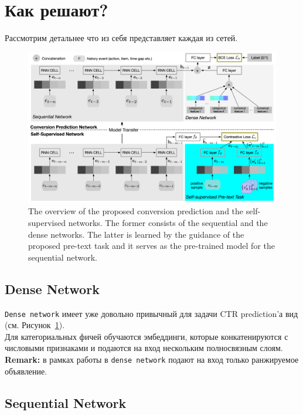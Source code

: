 \section{Как решают?}

Рассмотрим детальнее что из себя представляет каждая из сетей. 

\begin{figure}[ht]
    \centering
    \includegraphics[width=1.0\linewidth]{images/pretraining.png}
    \caption{\small{The overview of the proposed conversion prediction and the self-supervised networks. The former consists of the sequential and the dense networks. The latter is learned by the guidance of the proposed pre-text task and it serves as the pre-trained model for the sequential network.}}
    \label{fig:pretrainig}
\end{figure}

\subsection{Dense Network}

\texttt{Dense network} имеет уже довольно привычный для задачи CTR prediction'а вид (см. Рисунок~\ref{fig:pretrainig}). \\

Для категориальных фичей обучаются эмбеддинги, которые конкатенируются с числовыми признаками и подаются на вход нескольким полносвязным слоям. \\

{\bf Remark:} в рамках работы в \texttt{dense network} подают на вход только ранжируемое объявление.

\subsection{Sequential Network}

